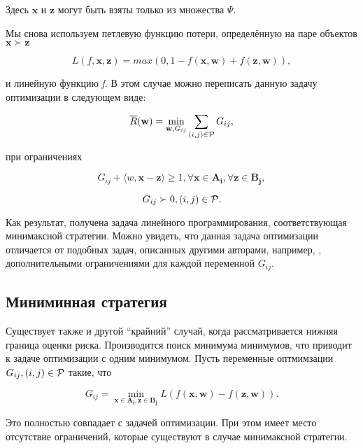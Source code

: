 \documentclass[12pt,a4paper,oneside]{article}
\begin{document}
\par
Здесь \(\mathbf{x}\) и \(\mathbf{z}\) могут быть взяты только из множества \(\Psi\). 

\par
Мы снова используем петлевую функцию потери, определённую на паре объектов \(\mathbf{x} \succ \mathbf{z}\)

\[
L(f, \mathbf{x}, \mathbf{z}) = max (0,1 - f(\mathbf{x}, \mathbf{w}) + f(\mathbf{z}, \mathbf{w})),
\]

\par
и линейную функцию \emph{f}. 
В этом случае можно переписать данную задачу оптимизации в следующем виде:

\[
\overline{R}(\mathbf{w}) = \underset{\mathbf{w}, G_{ij}}{\operatorname{min}} \sum \limits_{(i, j) \in \mathcal{P}} G_{ij},
\]

\par
при ограничениях

\[
G_{ij} + \langle w, \mathbf{x} - \mathbf{z} \rangle \geq 1, \forall \mathbf{x} \in \mathbf{A_i}, \forall \mathbf{z} \in \mathbf{B_j}, 
\]

\[
G_{ij} \succ 0, (i, j) \in \mathcal{P}.
\]

\par
Как результат, получена задача линейного программирования, соответствующая минимаксной стратегии. 
Можно увидеть, что данная задача оптимизации отличается от подобных задач, описанных другими авторами, например, , дополнительными ограничениями для каждой переменной \(G_{ij}\). 


\subsection{Миниминная стратегия}

\par
Существует также и другой ``крайний'' случай, когда рассматривается нижняя граница оценки риска. 
Производится поиск минимума минимумов, что приводит к задаче оптимизации с одним минимумом. 
Пусть переменные оптмимзации \(G_{ij}, (i, j) \in \mathcal{P}\) такие, что

\[
G_{ij} = \underset{\mathbf{x} \in \mathbf{A_i}, \mathbf{z} \in \mathbf{B_j}}{\operatorname{min}} L (f (\mathbf{x}, \mathbf{w}) - f(\mathbf{z}, \mathbf{w})). 
\]

\par
Это полностью совпадает с задачей оптимизации. При этом имеет место отсутствие ограничений, которые существуют в случае минимаксной стратегии.
\end{document}
